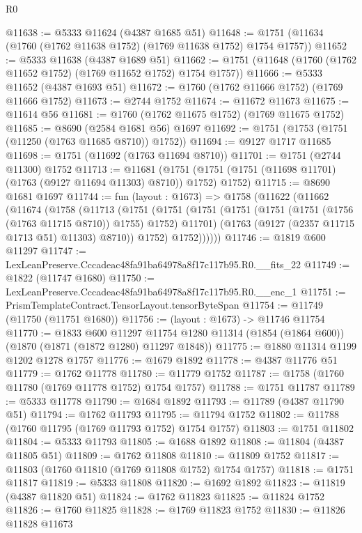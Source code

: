 \begin{lexlean}{R0}
\begin{coremodule}
@11638 := @5333 @11624 (@4387 @1685 @51)
@11648 := @1751 (@11634 (@1760 (@1762 @11638 @1752) (@1769 @11638 @1752) @1754 @1757))
@11652 := @5333 @11638 (@4387 @1689 @51)
@11662 := @1751 (@11648 (@1760 (@1762 @11652 @1752) (@1769 @11652 @1752) @1754 @1757))
@11666 := @5333 @11652 (@4387 @1693 @51)
@11672 := @1760 (@1762 @11666 @1752) (@1769 @11666 @1752)
@11673 := @2744 @1752
@11674 := @11672 @11673
@11675 := @11614 @56
@11681 := @1760 (@1762 @11675 @1752) (@1769 @11675 @1752)
@11685 := @8690 (@2584 @1681 @56) @1697
@11692 := @1751 (@1753 (@1751 (@11250 (@1763 @11685 @8710)) @1752))
@11694 := @9127 @1717 @11685
@11698 := @1751 (@11692 (@1763 @11694 @8710))
@11701 := @1751 (@2744 @11300) @1752
@11713 := @11681
    (@1751 (@1751 (@1751 (@11698 @11701) (@1763 (@9127 @11694 @11303) @8710)) @1752) @1752)
@11715 := @8690 @1681 @1697
@11744 := fun (layout : @1673) =>
  @1758
    (@11622
      (@11662
        (@11674
          (@1758
            (@11713
              (@1751
                (@1751
                  (@1751
                    (@1751 (@1751 (@1751 (@1756 (@1763 @11715 @8710)) @1755) @1752) @11701)
                    (@1763 (@9127 (@2357 @11715 @1713 @51) @11303) @8710))
                  @1752)
                @1752))))))
@11746 := @1819 @600 @11297
@11747 := LexLeanPreserve.Cccadeac48fa91ba64978a8f17c117b95.R0.__fits_22
@11749 := @1822 (@11747 @1680)
@11750 := LexLeanPreserve.Cccadeac48fa91ba64978a8f17c117b95.R0.__enc_1
@11751 := PrismTemplateContract.TensorLayout.tensorByteSpan
@11754 := @11749 (@11750 (@11751 @1680))
@11756 := (layout : @1673) -> @11746 @11754
@11770 := @1833
    @600
    @11297
    @11754
    @1280
    @11314
    (@1854 (@1864 @600))
    (@1870 (@1871 (@1872 @1280) @11297 @1848))
@11775 := @1880 @11314 @1199 @1202 @1278 @1757
@11776 := @1679 @1892
@11778 := @4387 @11776 @51
@11779 := @1762 @11778
@11780 := @11779 @1752
@11787 := @1758 (@1760 @11780 (@1769 @11778 @1752) @1754 @1757)
@11788 := @1751 @11787
@11789 := @5333 @11778
@11790 := @1684 @1892
@11793 := @11789 (@4387 @11790 @51)
@11794 := @1762 @11793
@11795 := @11794 @1752
@11802 := @11788 (@1760 @11795 (@1769 @11793 @1752) @1754 @1757)
@11803 := @1751 @11802
@11804 := @5333 @11793
@11805 := @1688 @1892
@11808 := @11804 (@4387 @11805 @51)
@11809 := @1762 @11808
@11810 := @11809 @1752
@11817 := @11803 (@1760 @11810 (@1769 @11808 @1752) @1754 @1757)
@11818 := @1751 @11817
@11819 := @5333 @11808
@11820 := @1692 @1892
@11823 := @11819 (@4387 @11820 @51)
@11824 := @1762 @11823
@11825 := @11824 @1752
@11826 := @1760 @11825
@11828 := @1769 @11823 @1752
@11830 := @11826 @11828 @11673

\end{coremodule}
\end{lexlean}
